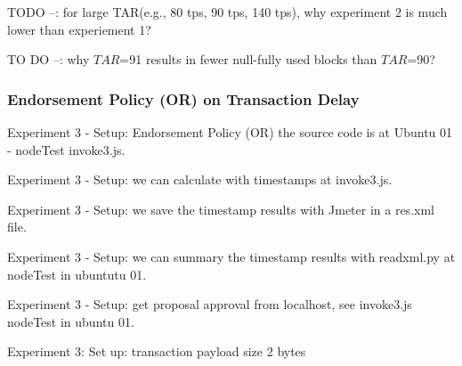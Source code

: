 \documentclass[10pt,journal,compsoc, twoside]{IEEEtran}
\begin{document}
TODO --: for large TAR(e.g., 80 tps, 90 tps, 140 tps), why experiment 2 is much lower than experiement 1?

TO DO --: why $TAR$=91 results in fewer null-fully used blocks than $TAR$=90? 





\subsubsection{Endorsement Policy (OR) on Transaction Delay}

Experiment 3 - Setup: Endorsement Policy (OR) the source code is at Ubuntu 01 - nodeTest invoke3.js.

Experiment 3 - Setup: we can calculate with timestamps at invoke3.js.

Experiment 3 - Setup: we save the timestamp results with Jmeter in a res.xml file.

Experiment 3 - Setup: we can summary the timestamp results with readxml.py at nodeTest in ubuntutu 01.

Experiment 3 - Setup: get proposal approval from localhost, see invoke3.js nodeTest in ubuntu 01.

Experiment 3: Set up: transaction payload size 2 bytes
\end{document}
